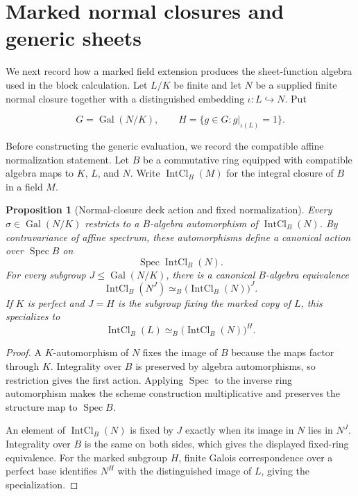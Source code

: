 \documentclass[11pt]{article}
\newtheorem{proposition}[theorem]{Proposition}
\theoremstyle{definition}
\theoremstyle{remark}
\DeclareMathOperator{\Gal}{Gal}
\begin{document}
\section{Marked normal closures and generic sheets}
\label{sec:generic-sheets}

We next record how a marked field extension produces the sheet-function
algebra used in the block calculation.  Let \(L/K\) be finite and let \(N\)
be a supplied finite normal closure together with a distinguished embedding
\(\iota:L\hookrightarrow N\).  Put

\[
  G=\Gal(N/K),
  \qquad
  H=\{g\in G:g|_{\iota(L)}=1\}.
\]

Before constructing the generic evaluation, we record the compatible affine
normalization statement.  Let \(B\) be a commutative ring equipped with
compatible algebra maps to \(K\), \(L\), and \(N\).  Write
\(\operatorname{IntCl}_B(M)\) for the integral closure of \(B\) in a field
\(M\).

\begin{proposition}[Normal-closure deck action and fixed normalization]
\label{prop:fixed-normalization}
Every \(\sigma\in\Gal(N/K)\) restricts to a \(B\)-algebra automorphism of
\(\operatorname{IntCl}_B(N)\).  By contravariance of affine spectrum, these
automorphisms define a canonical action over \(\operatorname{Spec}B\) on
\[
  \operatorname{Spec}\operatorname{IntCl}_B(N).
\]
For every subgroup \(J\leq\Gal(N/K)\), there is a canonical \(B\)-algebra
equivalence
\[
  \operatorname{IntCl}_B(N^J)
  \simeq_B
  \bigl(\operatorname{IntCl}_B(N)\bigr)^J.
\]
If \(K\) is perfect and \(J=H\) is the subgroup fixing the marked copy of
\(L\), this specializes to
\[
  \operatorname{IntCl}_B(L)
  \simeq_B
  \bigl(\operatorname{IntCl}_B(N)\bigr)^H.
\]
\end{proposition}

\begin{proof}
A \(K\)-automorphism of \(N\) fixes the image of \(B\) because the maps
factor through \(K\).  Integrality over \(B\) is preserved by algebra
automorphisms, so restriction gives the first action.  Applying
\(\operatorname{Spec}\) to the inverse ring automorphism makes the scheme
construction multiplicative and preserves the structure map to
\(\operatorname{Spec}B\).

An element of \(\operatorname{IntCl}_B(N)\) is fixed by \(J\) exactly when
its image in \(N\) lies in \(N^J\).  Integrality over \(B\) is the same on
both sides, which gives the displayed fixed-ring equivalence.  For the marked
subgroup \(H\), finite Galois correspondence over a perfect base identifies
\(N^H\) with the distinguished image of \(L\), giving the specialization.
\end{proof}
\end{document}
